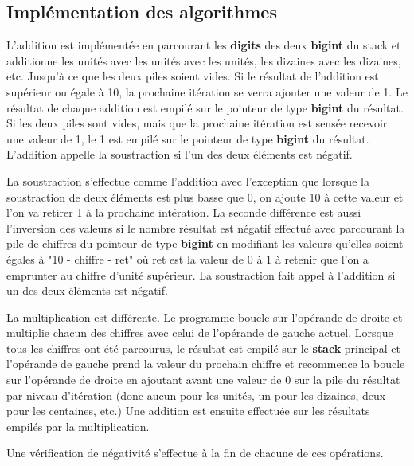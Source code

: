 \documentclass[]{report}
\begin{document}
	\begin{normalsize}
		\section*{\LARGE Implémentation des algorithmes}\vspace{4mm}
		L'addition est implémentée en parcourant les \textbf{digits} des deux \textbf{bigint} du stack et additionne les unités avec les unités avec les unités, les dizaines avec les dizaines, etc. Jusqu'à ce que les deux piles soient vides. Si le résultat de l'addition est supérieur ou égale à 10, la prochaine itération se verra ajouter une valeur de 1. Le résultat de chaque addition est empilé sur le pointeur de type \textbf{bigint} du résultat. Si les deux piles sont vides, mais que la prochaine itération est sensée recevoir une valeur de 1, le 1 est empilé sur le pointeur de type \textbf{bigint} du résultat. L'addition appelle la soustraction si l'un des deux éléments est négatif.
		\vspace{4mm}
		
		\par La soustraction s'effectue comme l'addition avec l'exception que lorsque la soustraction de deux éléments est plus basse que 0, on ajoute 10 à cette valeur et l'on va retirer 1 à la prochaine intération. La seconde différence est aussi l'inversion des valeurs si le nombre résultat est négatif effectué avec parcourant la pile de chiffres du pointeur de type \textbf{bigint} en modifiant les valeurs qu'elles soient égales à "10 - chiffre - ret" où ret est la valeur de 0 à 1 à retenir que l'on a emprunter au chiffre d'unité supérieur. La soustraction fait appel à l'addition si un des deux éléments est négatif.\vspace{4mm}
		
		\par La multiplication est différente. Le programme boucle sur l'opérande de droite et multiplie chacun des chiffres avec celui de l'opérande de gauche actuel. Lorsque tous les chiffres ont été parcourus, le résultat est empilé sur le \textbf{stack} principal et l'opérande de gauche prend la valeur du prochain chiffre et recommence la boucle sur l'opérande de droite en ajoutant avant une valeur de 0 sur la pile du résultat par niveau d'itération (donc aucun pour les unités, un pour les dizaines, deux pour les centaines, etc.) Une addition est ensuite effectuée sur les résultats empilés par la multiplication. \vspace{4mm}
		
		\par Une vérification de négativité s'effectue à la fin de chacune de ces opérations.
		\vspace{4mm}
	\end{normalsize}
\end{document}
